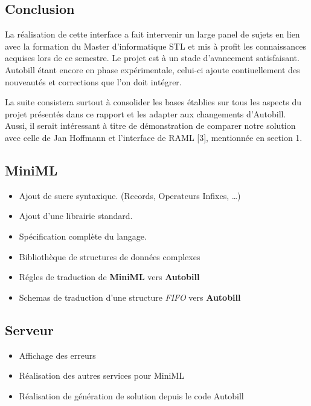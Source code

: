 \documentclass[
  12pt,
]{article}
\providecommand{\tightlist}{%
  \setlength{\itemsep}{0pt}\setlength{\parskip}{0pt}}
\begin{document}
\hypertarget{conclusion}{%
\subsection{Conclusion}\label{conclusion}}

La réalisation de cette interface a fait intervenir un large panel de
sujets en lien avec la formation du Master d'informatique STL et mis à
profit les connaissances acquises lors de ce semestre. Le projet est à
un stade d'avancement satisfaisant. Autobill étant encore en phase
expérimentale, celui-ci ajoute contiuellement des nouveautés et
corrections que l'on doit intégrer.

La suite consistera surtout à consolider les bases établies sur tous les
aspects du projet présentés dans ce rapport et les adapter aux
changements d'Autobill. Aussi, il serait intéressant à titre de
démonstration de comparer notre solution avec celle de Jan Hoffmann et
l'interface de RAML {[}3{]}, mentionnée en section 1.

\hypertarget{miniml-1}{%
\subsection{MiniML}\label{miniml-1}}

\begin{itemize}
\tightlist
\item
  Ajout de sucre syntaxique. (Records, Operateurs Infixes, \ldots)
\item
  Ajout d'une librairie standard.
\item
  Spécification complète du langage.
\item
  Bibliothèque de structures de données complexes
\item
  Régles de traduction de \textbf{MiniML} vers \textbf{Autobill}
\item
  Schemas de traduction d'une structure \emph{FIFO} vers
  \textbf{Autobill}
\end{itemize}

\hypertarget{serveur}{%
\subsection{Serveur}\label{serveur}}

\begin{itemize}
\tightlist
\item
  Affichage des erreurs
\item
  Réalisation des autres services pour MiniML
\item
  Réalisation de génération de solution depuis le code Autobill
\end{itemize}
\end{document}
